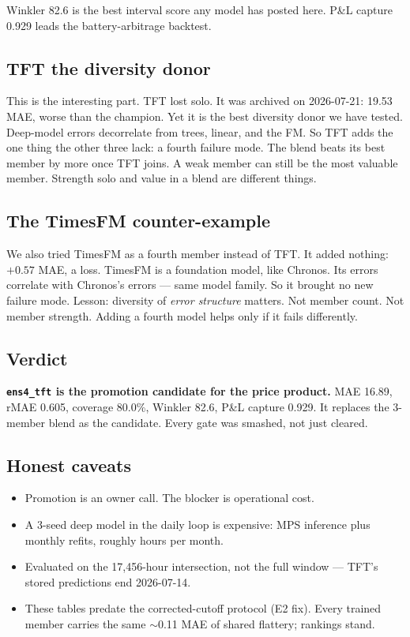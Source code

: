 \vspace{0.5em}
Winkler 82.6 is the best interval score any model has posted here.
P\&L capture 0.929 leads the battery-arbitrage backtest.

\subsection{TFT the diversity donor}

This is the interesting part. TFT lost solo.
It was archived on 2026-07-21: 19.53 MAE, worse than the champion.
Yet it is the best diversity donor we have tested.
Deep-model errors decorrelate from trees, linear, and the FM.
So TFT adds the one thing the other three lack: a fourth failure mode.
The blend beats its best member by more once TFT joins.
A weak member can still be the most valuable member.
Strength solo and value in a blend are different things.

\subsection{The TimesFM counter-example}

We also tried TimesFM as a fourth member instead of TFT.
It added nothing: $+0.57$ MAE, a loss.
TimesFM is a foundation model, like Chronos.
Its errors correlate with Chronos's errors --- same model family.
So it brought no new failure mode.
Lesson: diversity of \emph{error structure} matters.
Not member count. Not member strength.
Adding a fourth model helps only if it fails differently.

\subsection{Verdict}

\textbf{\texttt{ens4\_tft} is the promotion candidate for the price
product.} MAE 16.89, rMAE 0.605, coverage 80.0\%, Winkler 82.6,
P\&L capture 0.929. It replaces the 3-member blend as the candidate.
Every gate was smashed, not just cleared.

\subsection{Honest caveats}

\begin{itemize}
\item Promotion is an owner call. The blocker is operational cost.
\item A 3-seed deep model in the daily loop is expensive:
      MPS inference plus monthly refits, roughly hours per month.
\item Evaluated on the 17,456-hour intersection, not the full window
      --- TFT's stored predictions end 2026-07-14.
\item These tables predate the corrected-cutoff protocol
      (E2 fix). Every trained member carries the same $\sim$0.11 MAE
      of shared flattery; rankings stand.
\end{itemize}

